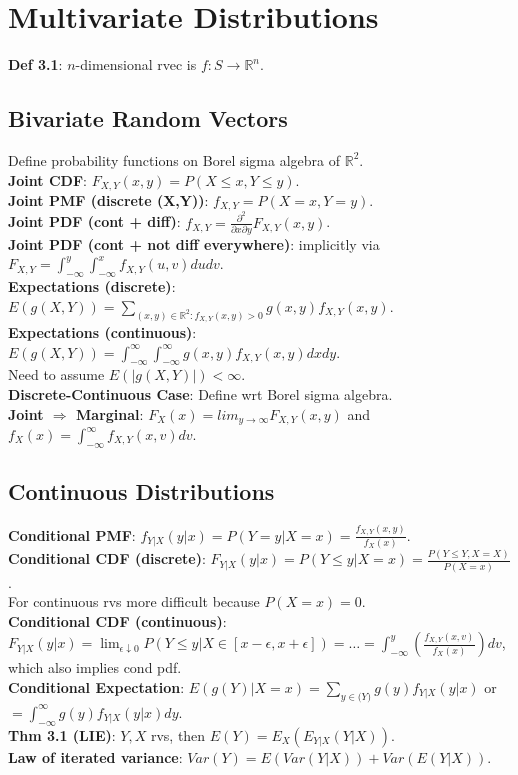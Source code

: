 \section{Multivariate Distributions}
\textbf{Def 3.1}: $n$-dimensional rvec is $f: S \to \mathbb{R}^n$.\\
\subsection{Bivariate Random Vectors}
Define probability functions on Borel sigma algebra of $\mathbb{R}^2$.\\
\textbf{Joint CDF}: $F_{X,Y}(x,y) = P(X\leq x, Y\leq y)$.\\
\textbf{Joint PMF (discrete (X,Y))}: $f_{X,Y} = P(X=x, Y=y)$.\\
\textbf{Joint PDF (cont + diff)}: $f_{X,Y} = \frac{\partial^2}{\partial x\partial y}F_{X,Y}(x,y)$.\\
\textbf{Joint PDF (cont + not diff everywhere)}: implicitly via $F_{X,Y} = \int_{-\infty}^y\int_{-\infty}^xf_{X,Y}(u,v)dudv$. \\
\textbf{Expectations (discrete)}: $E(g(X,Y)) = \sum_{(x,y)\in\mathbb{R}^2:f_{X,Y}(x,y)>0}g(x,y)f_{X,Y}(x,y)$.\\
\textbf{Expectations (continuous)}: $E(g(X,Y)) = \int_{-\infty}^\infty\int_{-\infty}^\infty g(x,y)f_{X,Y}(x,y)dxdy$.\\
Need to assume $E(|g(X,Y)|) < \infty$.\\
\textbf{Discrete-Continuous Case}: Define wrt Borel sigma algebra.\\
\textbf{Joint $\Rightarrow$ Marginal}: $F_X(x) = lim_{y\to\infty}F_{X,Y}(x,y)$ and $f_{X}(x) = \int_{-\infty}^\infty f_{X,Y}(x,v)dv$.\\

\subsection{Continuous Distributions}
\textbf{Conditional PMF}: $f_{Y|X}(y|x) = P(Y=y|X=x) = \frac{f_{X,Y}(x,y)}{f_X(x)}$.\\
\textbf{Conditional CDF (discrete)}: $F_{Y|X}(y|x) = P(Y\leq y|X=x) = \frac{P(Y\leq Y, X = X)}{P(X=x)}$.\\
For continuous rvs more difficult because $P(X=x) = 0$.\\
\textbf{Conditional CDF (continuous)}: $F_{Y|X}(y|x) = \lim_{\epsilon\downarrow0}P(Y\leq y | X \in [x-\epsilon, x + \epsilon]) = \ldots = \int_{-\infty}^y \left(\frac{f_{X,Y}(x,v)}{f_X(x)}\right)dv$, which also implies cond pdf.\\
\textbf{Conditional Expectation}: $E(g(Y)|X=x) = \sum_{y\in\mathbb(Y)}g(y)f_{Y|X}(y|x)$ or $=\int_{-\infty}^\infty g(y)f_{Y|X}(y|x)dy$.\\
\textbf{Thm 3.1 (LIE)}: $Y,X$ rvs, then $E(Y) = E_X(E_{Y|X}(Y|X))$.\\
\textbf{Law of iterated variance}: $Var(Y) = E(Var(Y|X)) + Var(E(Y|X))$.

